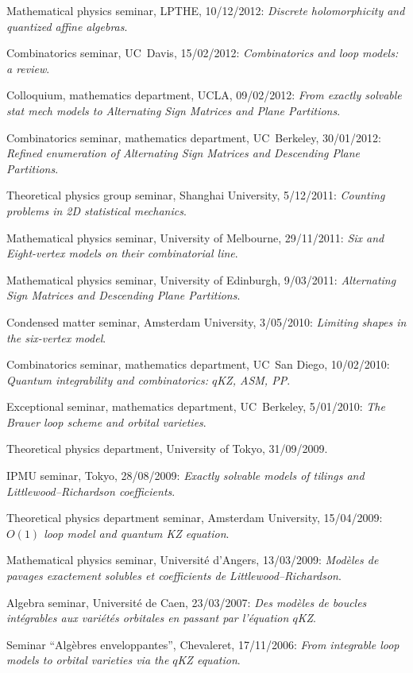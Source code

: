 \s Mathematical physics seminar, LPTHE, 10/12/2012: {\sl Discrete holomorphicity and quantized affine algebras}. 

\s Combinatorics seminar, UC~Davis, 15/02/2012: {\sl Combinatorics and loop models: a review}.

\s Colloquium, mathematics department, UCLA, 09/02/2012: {\sl From exactly solvable stat mech models to Alternating Sign Matrices and Plane Partitions}.

\s Combinatorics seminar, mathematics department, UC~Berkeley, 30/01/2012: {\sl Refined enumeration of Alternating Sign Matrices and Descending Plane Partitions}.

\s Theoretical physics group seminar, Shanghai University, 5/12/2011: {\sl Counting problems in 2D statistical mechanics}.

\s Mathematical physics seminar, University of Melbourne, 29/11/2011: {\sl Six and Eight-vertex models on their combinatorial line}.

\s Mathematical physics seminar, University of Edinburgh, 9/03/2011: {\sl Alternating Sign Matrices and Descending Plane Partitions}.

\s Condensed matter seminar, Amsterdam University, 3/05/2010:
{\sl Limiting shapes in the six-vertex model}.

\s Combinatorics seminar, mathematics department, UC~San Diego,
10/02/2010:
{\sl Quantum integrability and combinatorics: $q$KZ, ASM, PP}.

\s Exceptional seminar, mathematics department, UC~Berkeley,
5/01/2010:
{\sl The Brauer loop scheme and orbital varieties}.

\s Theoretical physics department, University of Tokyo,
31/09/2009.

\s IPMU seminar, Tokyo, 28/08/2009:
{\sl Exactly solvable models of tilings and Littlewood--Richardson coefficients}.

\s Theoretical physics department seminar,
Amsterdam University, 15/04/2009:
{\sl $O(1)$ loop model and quantum KZ equation}.

\s Mathematical physics seminar,
Universit\'e d'Angers, 13/03/2009:
{\sl Mod\`eles de pavages exactement solubles et coefficients de Littlewood--Richardson}.

\s Algebra seminar, Universit\'e de Caen, 23/03/2007:
{\sl Des mod\`eles de boucles int\'egrables aux vari\'et\'es orbitales en passant par
l'\'equation $q$KZ}.

\s Seminar ``Alg\`ebres enveloppantes'', Chevaleret, 17/11/2006:
{\sl From integrable loop models to orbital varieties via the $q$KZ equation}.

